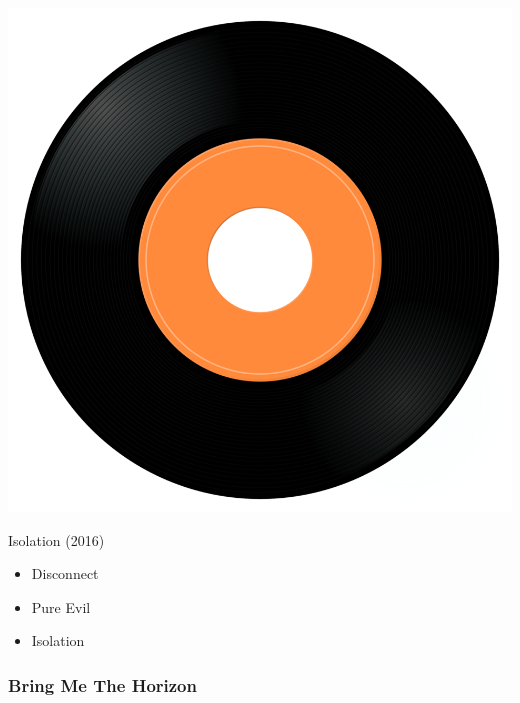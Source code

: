 \begin{minipage}[t]{0.25\textwidth}
\captionsetup{type=figure}
\includegraphics[width=\textwidth]{Images/cover.png}
\caption*{Isolation (2016)}
\end{minipage}
\begin{minipage}[t]{0.25\textwidth}\vspace{0pt}
\begin{itemize}[nosep,leftmargin=1em,labelwidth=*,align=left]
	\setlength{\itemsep}{0pt}
	\item Disconnect
	\item Pure Evil
	\item Isolation
\end{itemize}
\end{minipage}

\subsubsection{Bring Me The Horizon}

